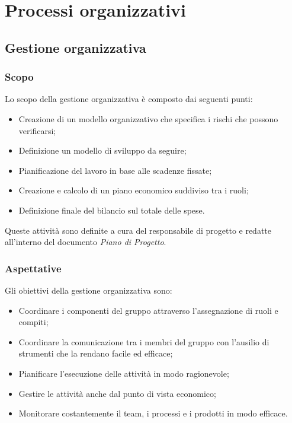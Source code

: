 %
\section{Processi organizzativi}
	\subsection{Gestione organizzativa}
		\subsubsection{Scopo}
			Lo scopo della gestione organizzativa è composto dai seguenti punti:
			\begin{itemize}
				\item Creazione di un modello organizzativo che specifica i rischi che possono verificarsi;
				\item Definizione un modello di sviluppo da seguire;
				\item Pianificazione del lavoro in base alle scadenze fissate;
				\item Creazione e calcolo di un piano economico suddiviso tra i ruoli;
				\item Definizione finale del bilancio sul totale delle spese.
			\end{itemize}
			Queste attività sono definite a cura del responsabile di progetto e redatte all'interno del documento \textit{Piano di Progetto}.
		\subsubsection{Aspettative}
			Gli obiettivi della gestione organizzativa sono:
			\begin{itemize}
				\item Coordinare i componenti del gruppo attraverso l'assegnazione di ruoli e compiti;
				\item Coordinare la comunicazione tra i membri del gruppo con l'ausilio di strumenti che la rendano facile ed efficace;
				\item Pianificare l'esecuzione delle attività in modo ragionevole;
				\item Gestire le attività anche dal punto di vista economico;
				\item Monitorare costantemente il team, i processi e i prodotti in modo efficace.
			\end{itemize}
